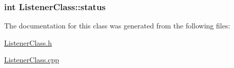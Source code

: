 \hypertarget{classListenerClass_ac7e26fe8e0be92e2f3a789bec5ef0769}{
\subsubsection[{status}]{\setlength{\rightskip}{0pt plus 5cm}int {\bf \-Listener\-Class\-::status}}}\label{classListenerClass_ac7e26fe8e0be92e2f3a789bec5ef0769}


\-The documentation for this class was generated from the following files\-:\begin{DoxyCompactItemize}
\item 
\hyperlink{ListenerClass_8h}{\-Listener\-Class.\-h}\item 
\hyperlink{ListenerClass_8cpp}{\-Listener\-Class.\-cpp}\end{DoxyCompactItemize}
